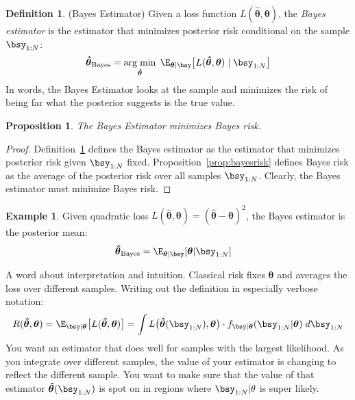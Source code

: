 \documentclass[12pt]{article}
\theoremstyle{plain}
\newtheorem{prop}[thm]{Proposition}
\theoremstyle{definition}
\newtheorem{defn}[thm]{Definition}
\newtheorem{ex}[thm]{Example}
\theoremstyle{remark}
\newcommand{\bstheta}{\boldsymbol{\theta}}
\newcommand{\bshattheta}{\boldsymbol{\hat{\theta}}}
\DeclareMathOperator*{\argmin}{arg\;min}
\begin{document}
\begin{defn}(Bayes Estimator)
\label{defn:bayesest}
Given a loss function $L(\bshattheta,\bstheta)$, the
\emph{Bayes estimator} is the estimator that minimizes posterior risk
conditional on the sample $\bsy_{1:N}$:
\begin{align*}
  \bshattheta_{\text{Bayes}}
  = \argmin_{\bshattheta} \;
  \E_{\bstheta|\bsy}\big[
    L(\bshattheta,\bstheta)\;|\;\bsy_{1:N}
  \big]
\end{align*}
In words, the Bayes Estimator looks at the sample and minimizes the risk
of being far what the posterior suggests is the true value.
\end{defn}

\begin{prop}
The Bayes Estimator minimizes Bayes risk.
\end{prop}
\begin{proof}
Definition~\ref{defn:bayesest} defines the Bayes estimator as the
estimator that minimizes posterior risk given $\bsy_{1:N}$ fixed.
Proposition~\ref{prop:bayesrisk} defines Bayes risk as the average of
the posterior risk over all samples $\bsy_{1:N}$. Clearly, the Bayes
estimator must minimize Bayes risk.
\end{proof}


\begin{ex}
Given quadratic loss $L(\bshattheta,\bstheta) =
(\bshattheta-\bstheta)^2$, the Bayes estimator is the posterior mean:
\begin{align*}
  \bshattheta_{\text{Bayes}}
  &= \E_{\bstheta|\bsy}[\bstheta|\bsy_{1:N}]
\end{align*}
\end{ex}

A word about interpretation and intuition. Classical risk fixes
$\bstheta$ and averages the loss over different samples. Writing out the
definition in especially verbose notation:
\begin{align*}
  R(\bshattheta,\bstheta)=
  \E_{\bsy|\bstheta}\big[
    L(\bshattheta,\bstheta)
  \big] =
  \int L\big(\bshattheta(\bsy_{1:N}),\bstheta\big)
    \cdot f_{\bsy|\bstheta}(\bsy_{1:N}|\bstheta)\; d\bsy_{1:N}
\end{align*}
You want an estimator that does well for samples with the largest
likelihood. As you integrate over different samples, the value of your
estimator is changing to reflect the different sample. You want to make
sure that the value of that estimator $\bshattheta(\bsy_{1:N})$ is
spot on in regions where $\bsy_{1:N}|\theta$ is super likely.
\end{document}
